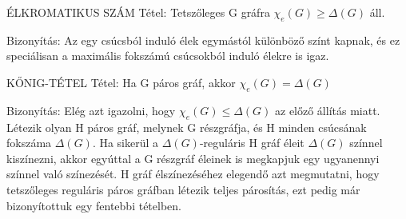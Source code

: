 \begin{framed}
ÉLKROMATIKUS SZÁM Tétel: Tetszőleges G gráfra $\chi_e(G) \geq \Delta(G)$ áll.
\end{framed}
\begin{leftbar}
Bizonyítás: Az egy csúcsból induló élek egymástól különböző színt kapnak, és ez speciálisan a maximális fokszámú csúcsokból induló élekre is igaz.
\end{leftbar}
\begin{framed}
KŐNIG-TÉTEL Tétel: Ha G páros gráf, akkor $\chi_e(G) = \Delta(G)$
\end{framed}
\begin{leftbar}
Bizonyítás: Elég azt igazolni, hogy $\chi_e(G) \leq \Delta(G)$ az előző állítás miatt. Létezik olyan H páros gráf, melynek G részgráfja, és H minden csúcsának fokszáma $\Delta(G)$. Ha sikerül a $\Delta(G)$-reguláris H gráf éleit $\Delta(G)$ színnel kiszínezni, akkor egyúttal a G részgráf éleinek is megkapjuk egy ugyanennyi színnel való színezését. H gráf élszínezéséhez elegendő azt megmutatni, hogy tetszőleges reguláris páros gráfban létezik teljes párosítás, ezt pedig már bizonyítottuk egy fentebbi tételben.
\end{leftbar}
